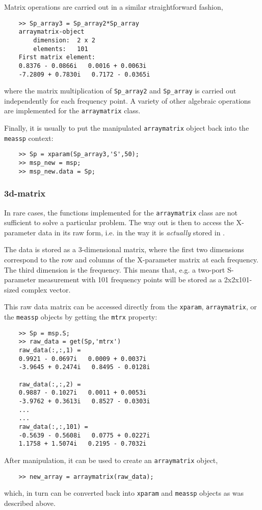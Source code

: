 Matrix operations are carried out in a similar straightforward fashion,
\begin{small}
\begin{verbatim}
    >> Sp_array3 = Sp_array2*Sp_array
    arraymatrix-object
        dimension:  2 x 2
        elements:   101
    First matrix element:
    0.8376 - 0.0866i   0.0016 + 0.0063i
    -7.2809 + 0.7830i   0.7172 - 0.0365i
\end{verbatim}
\end{small}
where the matrix multiplication of \verb"Sp_array2" and
\verb"Sp_array" is carried out independently for each frequency
point. A variety of other algebraic operations are implemented for
the \verb"arraymatrix" class.

Finally, it is usually to put the manipulated \verb"arraymatrix"
object back into the \verb"meassp" context:
\begin{small}
\begin{verbatim}
    >> Sp = xparam(Sp_array3,'S',50);
    >> msp_new = msp;
    >> msp_new.data = Sp;
\end{verbatim}
\end{small}

\subsubsection{3d-matrix}
In rare cases, the functions implemented for the
\verb"arraymatrix" class are not sufficient to solve a particular
problem. The way out is then to access the X-parameter data in its
raw form, i.e. in the way it is \emph{actually} stored in \matlab.

The data is stored as a 3-dimensional matrix, where the first two
dimensions correspond to the row and columns of the X-parameter
matrix at each frequency. The third dimension is the frequency.
This means that, e.g. a two-port S-parameter measurement with 101
frequency points will be stored as a 2x2x101-sized complex vector.

This raw data matrix can be accessed directly from the
\verb"xparam", \verb"arraymatrix", or the \verb"meassp" objects by
getting the \verb"mtrx" property:
\begin{small}
\begin{verbatim}
    >> Sp = msp.S;
    >> raw_data = get(Sp,'mtrx')
    raw_data(:,:,1) =
    0.9921 - 0.0697i   0.0009 + 0.0037i
    -3.9645 + 0.2474i   0.8495 - 0.0128i

    raw_data(:,:,2) =
    0.9887 - 0.1027i   0.0011 + 0.0053i
    -3.9762 + 0.3613i   0.8527 - 0.0303i
    ...
    ...
    raw_data(:,:,101) =
    -0.5639 - 0.5608i   0.0775 + 0.0227i
    1.1758 + 1.5074i   0.2195 - 0.7032i
\end{verbatim}
\end{small}
After manipulation, it can be used to create an \verb"arraymatrix"
object,
\begin{small}
\begin{verbatim}
    >> new_array = arraymatrix(raw_data);
\end{verbatim}
\end{small}
which, in turn can be converted back into \verb"xparam" and
\verb"meassp" objects as was described above.
